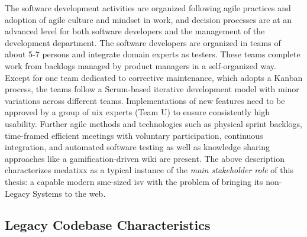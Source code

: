 The software development activities are organized following agile practices and adoption of agile culture and mindset in work, and decision processes are at an advanced level for both software developers and the management of the development department.
The software developers are organized in teams of about 5-7 persons and integrate domain experts as testers.
These teams complete work from backlogs managed by product managers in a self-organized way.
Except for one team dedicated to corrective maintenance, which adopts a Kanban \autocite{Anderson2010Kanban} process, the teams follow a Scrum-based \autocite{Beedle2002Scrum} iterative development model with minor variations across different teams.
Implementations of new features need to be approved by a group of \gls{uix} experts (Team U) to ensure consistently high usability.
Further agile methods and technologies such as physical sprint backlogs, time-framed efficient meetings with voluntary participation, continuous integration, and automated software testing as well as knowledge sharing approaches like a gamification-driven wiki are present.
The above description characterizes medatixx as a typical instance of the \emph{main stakeholder role} of this thesis: a capable modern \gls{sme}-sized \gls{isv} with the problem of bringing its non- \glspl{Legacy System} to the \gls{web}.

\vspace{-10pt}
\hypertarget{sec:scenario-code}{%
\subsection{Legacy Codebase Characteristics}\label{sec:scenario-code}}
\vspace{10pt}

